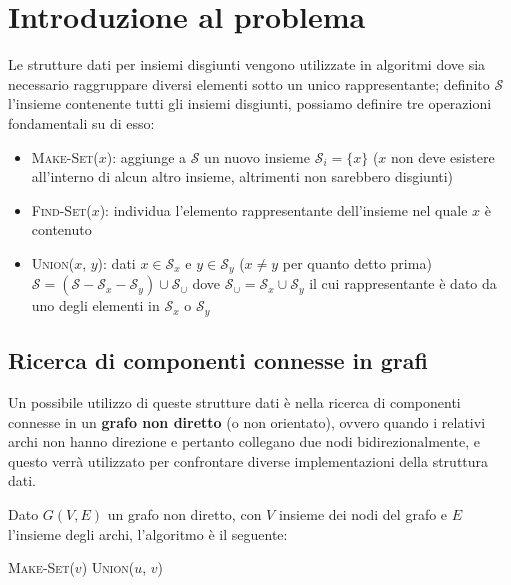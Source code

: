\section{Introduzione al problema}

Le strutture dati per insiemi disgiunti vengono utilizzate in algoritmi
dove sia necessario raggruppare diversi elementi sotto un unico rappresentante;
definito $\mathcal{S}$ l'insieme contenente tutti gli insiemi disgiunti,
possiamo definire tre operazioni fondamentali su di esso:

\begin{itemize}
    \item \textsc{Make-Set($x$)}: aggiunge a $\mathcal{S}$ un nuovo insieme
          $\mathcal{S}_i = \{x\}$ ($x$ non deve esistere all'interno di alcun altro insieme,
          altrimenti non sarebbero disgiunti)
    \item \textsc{Find-Set($x$)}: individua l'elemento rappresentante dell'insieme nel quale $x$ è contenuto
    \item \textsc{Union($x$, $y$)}: dati $x \in \mathcal{S}_x$ e $y \in \mathcal{S}_y$
          ($x \ne y$ per quanto detto prima) $\mathcal{S} = (\mathcal{S} - \mathcal{S}_x - \mathcal{S}_y) \cup \mathcal{S}_\cup$
          dove $\mathcal{S}_\cup = \mathcal{S}_x \cup \mathcal{S}_y$ il cui rappresentante è
          dato da uno degli elementi in $\mathcal{S}_x$ o $\mathcal{S}_y$
\end{itemize}

\subsection{Ricerca di componenti connesse in grafi}

Un possibile utilizzo di queste strutture dati è nella ricerca di componenti
connesse in un \textbf{grafo non diretto} (o non orientato), ovvero quando i relativi
archi non hanno direzione e pertanto collegano due nodi bidirezionalmente,
e questo verrà utilizzato per confrontare diverse implementazioni della
struttura dati.\newline

Dato $G(V,E)$ un grafo non diretto, con $V$ insieme dei nodi del grafo e $E$
l'insieme degli archi, l'algoritmo è il seguente:

\begin{algorithmic}[1]
     \label{alg:firstfor}
    \STATE \textsc{Make-Set($v$)}
    \ENDFOR
     \label{alg:secondfor}
    \STATE \textsc{Union($u$, $v$)}
    \ENDIF
    \ENDFOR
\end{algorithmic}

